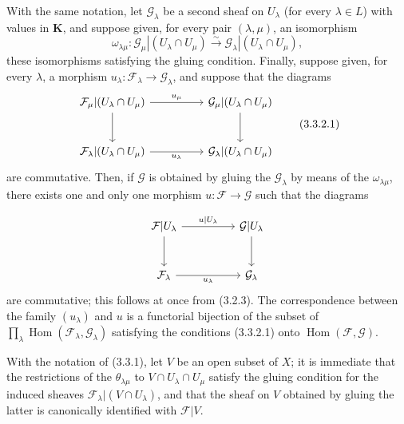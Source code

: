 \begin{env}[3.3.2]
\label{0.3.3.2}
With the same notation, let $\mathcal{G}_\lambda$ be a second sheaf on
$U_\lambda$ (for every $\lambda\in L$) with values in $\boldsymbol{K}$, and suppose
given, for every pair $(\lambda,\mu)$, an isomorphism
\[
  \omega_{\lambda\mu}:
  \mathcal{G}_\mu|(U_\lambda\cap U_\mu)
  \xrightarrow{\sim}
  \mathcal{G}_\lambda|(U_\lambda\cap U_\mu),
\]
these isomorphisms satisfying the gluing condition. Finally, suppose given,
for every $\lambda$, a morphism
$u_\lambda:\mathcal{F}_\lambda\to\mathcal{G}_\lambda$, and suppose that the diagrams
\begin{equation}
\begin{tikzcd}[column sep=huge,row sep=large]
\mathcal{F}_\mu|(U_\lambda\cap U_\mu)
  \arrow[r,"u_\mu"] \arrow[d]
  & \mathcal{G}_\mu|(U_\lambda\cap U_\mu) \arrow[d] \\
\mathcal{F}_\lambda|(U_\lambda\cap U_\mu)
  \arrow[r,"u_\lambda"']
  & \mathcal{G}_\lambda|(U_\lambda\cap U_\mu)
\end{tikzcd}
\tag{3.3.2.1}\label{0.3.3.2.1}
\end{equation}
are commutative. Then, if $\mathcal{G}$ is obtained by gluing the
$\mathcal{G}_\lambda$ by means of the $\omega_{\lambda\mu}$, there exists one and only one
morphism $u:\mathcal{F}\to\mathcal{G}$ such that the diagrams


\[
\begin{tikzcd}[column sep=huge,row sep=large]
\mathcal{F}|U_\lambda
  \arrow[r,"u|U_\lambda"] \arrow[d]
  & \mathcal{G}|U_\lambda \arrow[d] \\
\mathcal{F}_\lambda
  \arrow[r,"u_\lambda"']
  & \mathcal{G}_\lambda
\end{tikzcd}
\]
are commutative; this follows at once from (3.2.3). The correspondence between
the family $(u_\lambda)$ and $u$ is a functorial bijection of the subset of
$\prod_\lambda\operatorname{Hom}(\mathcal{F}_\lambda,\mathcal{G}_\lambda)$
satisfying the conditions (3.3.2.1) onto
$\operatorname{Hom}(\mathcal{F},\mathcal{G})$.
\end{env}

\begin{env}[3.3.3]
\label{0.3.3.3}
With the notation of (3.3.1), let $V$ be an open subset of $X$; it is immediate that
the restrictions of the $\theta_{\lambda\mu}$ to $V\cap U_\lambda\cap U_\mu$
satisfy the gluing condition for the induced sheaves
$\mathcal{F}_\lambda|(V\cap U_\lambda)$, and that the sheaf on $V$ obtained by
gluing the latter is canonically identified with $\mathcal{F}|V$.
\end{env}

